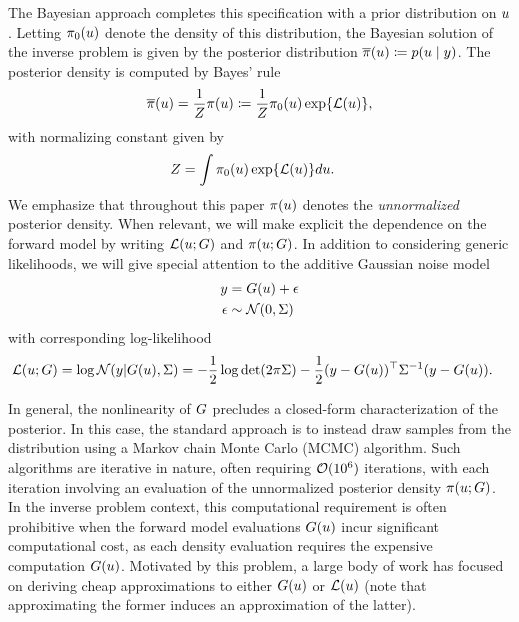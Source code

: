 \documentclass[12pt]{article}
\begin{document}
The Bayesian approach completes this specification with a prior distribution 
on $u$. Letting $\pi_0(u)$ denote the density of this distribution, the Bayesian solution of the inverse problem is given 
by the posterior distribution $\overline{\pi}(u) \coloneqq p(u \mid y)$. The posterior density is computed by Bayes' rule 
\begin{align}
\overline{\pi}(u) = \frac{1}{Z}\pi(u) \coloneqq \frac{1}{Z} \pi_0(u) \exp\mathopen{}\left\{\mathcal{L}(u)\right\}\mathclose{}, \label{post_dens}
\end{align}
with normalizing constant given by 
\begin{align}
Z &= \int \pi_0(u) \exp\mathopen{}\left\{\mathcal{L}(u)\right\}\mathclose{} du. \label{norm_cst}
\end{align}
We emphasize that throughout this paper $\pi(u)$ denotes the \textit{unnormalized} 
posterior density. When relevant, we will make explicit the dependence on the forward 
model by writing $\mathcal{L}(u; G)$ and $\pi(u; G)$. In addition to considering 
generic likelihoods, we will give special attention to the additive Gaussian noise model
\begin{align}
y &= G(u) + \epsilon \label{inv_prob_Gaussian} \\
\epsilon &\sim \mathcal{N}(0, \Sigma) \nonumber 
\end{align}
with corresponding log-likelihood 
\begin{align}
\mathcal{L}(u; G) &= \log\mathcal{N}(y| G(u), \Sigma) 
= -\frac{1}{2} \log\det (2\pi \Sigma) - \frac{1}{2} (y - G(u))^\top \Sigma^{-1} (y - G(u)). \label{llik_Gaussian}
\end{align}

In general, the nonlinearity of $G$ precludes a closed-form characterization of the posterior. In this case, the 
standard approach is to instead draw samples from the distribution using a Markov chain Monte Carlo (MCMC) 
algorithm. Such algorithms are iterative in nature, often requiring $\mathcal{O}(10^6)$ iterations, with each 
iteration involving an evaluation of the unnormalized posterior density $\pi(u; G)$. 
In the inverse problem context, this computational requirement is often prohibitive when the forward model 
evaluations $G(u)$ incur significant computational cost, as each density evaluation requires the 
expensive computation $G(u)$. Motivated by this problem, a large body of work has focused on deriving 
cheap approximations to either $G(u)$ or $\mathcal{L}(u)$ (note that approximating the former induces 
an approximation of the latter). 
 
\end{document}
